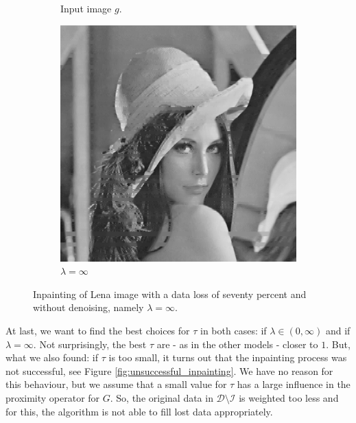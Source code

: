 \documentclass[abstracton]{scrreprt}
\begin{document}
\begin{figure}[!ht]
\begin{subfigure}[b]{0.30\textwidth}
                \caption{Input image $g$.}
            \end{subfigure}
            \begin{subfigure}[b]{0.30\textwidth}
                \includegraphics[width=\textwidth]{img/inpainting/pwclena.png}
                \caption{$\lambda = \infty$}
            \end{subfigure}
            \caption[Inpainting with seventy percent data loss without denoising.]{Inpainting of Lena image with a data loss of seventy percent and without denoising, namely $\lambda = \infty$.}
        \label{fig:inpainting_lena_rof_pwc}
        \end{figure}
        At last, we want to find the best choices for $\tau$ in both cases: if $\lambda \in (0, \infty)$ and if $\lambda = \infty$. Not surprisingly, the best $\tau$ are - as in the other models - closer to $1$. But, what we also found: if $\tau$ is too small, it turns out that the inpainting process was not successful, see Figure \ref{fig:unsuccessful_inpainting}. We have no reason for this behaviour, but we assume that a small value for $\tau$ has a large influence in the proximity operator for $G$. So, the original data in $\mathcal{D} \setminus \mathcal{I}$ is weighted too less and for this, the algorithm is not able to fill lost data appropriately.
\end{document}

